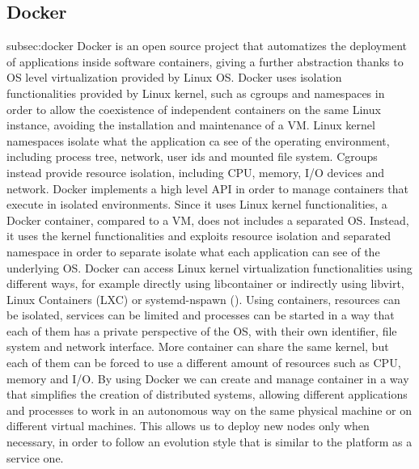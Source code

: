 \subsection{Docker}{subsec:docker}
Docker is an open source project that automatizes the deployment of
applications inside software containers, giving a further abstraction
thanks to OS level virtualization provided by Linux OS. Docker uses
isolation functionalities provided by Linux kernel, such as cgroups
and namespaces \cite{misc:Docker} in order to allow the coexistence of independent
containers on the same Linux instance, avoiding the installation and
maintenance of a VM.
Linux kernel namespaces isolate what the application ca see of the
operating environment, including process tree, network, user ids and
mounted file system. Cgroups instead provide resource isolation, including
CPU, memory, I/O devices and network.
Docker implements a high level API in order to manage containers
that execute in isolated environments. Since it uses Linux kernel functionalities,
a Docker container, compared to a VM, does not includes
a separated OS. Instead, it uses the kernel functionalities and exploits
resource isolation and separated namespace in order to separate isolate what each application can see of the underlying OS. Docker can
access Linux kernel virtualization functionalities using different ways,
for example directly using libcontainer or indirectly using libvirt,
Linux Containers (LXC) or systemd-nspawn ().
Using containers, resources can be isolated, services can be limited
and processes can be started in a way that each of them has a private
perspective of the OS, with their own identifier, file system and network
interface. More container can share the same kernel, but each of
them can be forced to use a different amount of resources such as CPU,
memory and I/O.
By using Docker we can create and manage container in a way
that simplifies the creation of distributed systems, allowing different
applications and processes to work in an autonomous way on the
same physical machine or on different virtual machines. This allows
us to deploy new nodes only when necessary, in order to follow an
evolution style that is similar to the platform as a service one.
